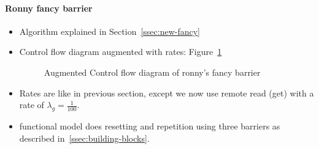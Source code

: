 \documentclass[a4paper, 10pt]{article}
\begin{document}
\begin{enumerate}
\paragraph{Ronny fancy barrier}
\label{ssssec:analysis-modelchecking-modelling-ronny-fancy}
\begin{itemize}
	\item Algorithm explained in Section~\ref{ssec:new-fancy}
	\item Control flow diagram augmented with rates: Figure~\ref{fig:ronny-fancy-control-flow}
		\begin{figure}[htbp]
			\centering
			
			\caption{Augmented Control flow diagram of ronny's fancy barrier}
			\label{fig:ronny-fancy-control-flow}
		\end{figure}
	\item Rates are like in previous section, except we now use remote read (get) with a rate of $\lambda_g = \frac{1}{100}$.
	\item functional model does resetting and repetition using three barriers as described in~\ref{ssec:building-blocks}.
\end{itemize}


\end{enumerate}
\end{document}
